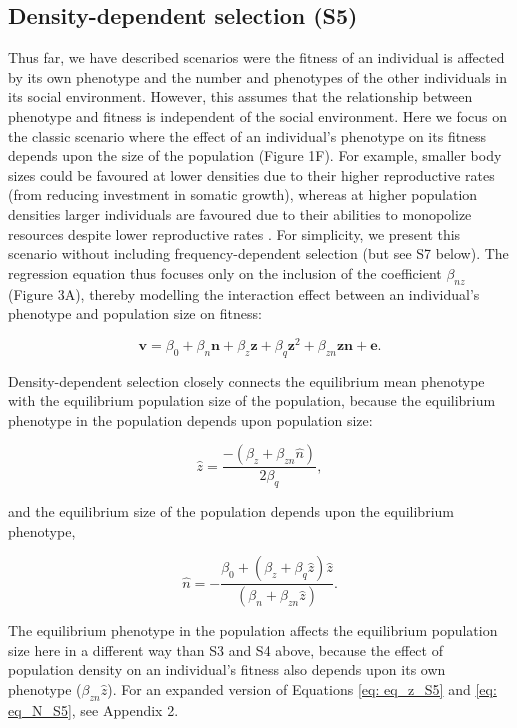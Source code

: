 \documentclass{article}
\begin{document}
	\subsection{Density-dependent selection (S5)}
	Thus far, we have described scenarios were the fitness of an individual is affected by its own phenotype and the number and phenotypes of the other individuals in its social environment. However, this assumes that the relationship between phenotype and fitness is independent of the social environment. Here we focus on the classic scenario where the effect of an individual's phenotype on its fitness depends upon the size of the population (Figure 1F). For example, smaller body sizes could be favoured at lower densities due to their higher reproductive rates (from reducing investment in somatic growth), whereas at higher population densities larger individuals are favoured due to their abilities to monopolize resources despite lower reproductive rates \citep{Wright2018}. For simplicity, we present this scenario without including frequency-dependent selection (but see S7 below). The regression equation thus focuses only on the inclusion of the coefficient $\beta_{nz}$ (Figure 3A), thereby modelling the interaction effect between an individual's phenotype and population size on fitness:
	
	\begin{equation} \label{eq: fitness_S5}
	\bm{v}=\beta_{0} +\beta_{n} \bm{n} + \beta_{z} \bm{z} + \beta_{q} \bm{z}^2 +  \beta_{zn} \bm{zn}  +  \bm{e}.
	\end{equation}
	
	\noindent Density-dependent selection closely connects the equilibrium mean phenotype with the equilibrium population size of the population, because the equilibrium phenotype in the population depends upon population size:
	
	\begin{equation} \label{eq: eq_z_S5}
	\hat{z}=\frac{-(\beta_{z}+\beta_{zn}\hat{n})}{2\beta_{q}},
	\end{equation} 
	
	and the equilibrium size of the population depends upon the equilibrium phenotype,
	
	\begin{equation} \label{eq: eq_N_S5}
	\hat{n} = -\frac{\beta_{0}+(\beta_{z}  + \beta_{q}\hat{z})\hat{z}}{(\beta_{n} +  \beta_{zn} \hat{z})}.
	\end{equation}
	
	\noindent The equilibrium phenotype in the population affects the equilibrium population size here in a different way than S3 and S4 above, because the effect of population density on an individual's fitness also depends upon its own phenotype ($\beta_{zn} \hat{z}$). For an expanded version of Equations \ref{eq: eq_z_S5} and \ref{eq: eq_N_S5}, see Appendix 2. 
	
\end{document}

